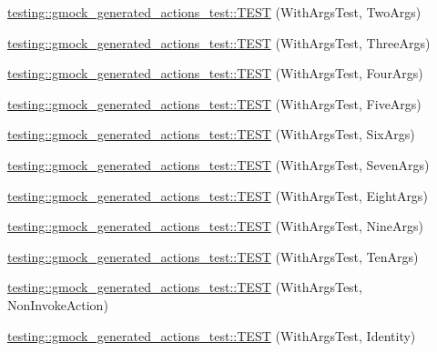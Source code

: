 \begin{DoxyCompactItemize}
\hyperlink{namespacetesting_1_1gmock__generated__actions__test_afadf90d2d0acc55906bfd7f0f43f8a04}{testing\+::gmock\+\_\+generated\+\_\+actions\+\_\+test\+::\+T\+E\+ST} (With\+Args\+Test, Two\+Args)
\item 
\hyperlink{namespacetesting_1_1gmock__generated__actions__test_acae0920fc83b3990663b9d448b8bfd9a}{testing\+::gmock\+\_\+generated\+\_\+actions\+\_\+test\+::\+T\+E\+ST} (With\+Args\+Test, Three\+Args)
\item 
\hyperlink{namespacetesting_1_1gmock__generated__actions__test_ab7046e566f75756b6fe1ec4d92ff7c2b}{testing\+::gmock\+\_\+generated\+\_\+actions\+\_\+test\+::\+T\+E\+ST} (With\+Args\+Test, Four\+Args)
\item 
\hyperlink{namespacetesting_1_1gmock__generated__actions__test_ab51a43ea1c760e001330400d6cec5bfc}{testing\+::gmock\+\_\+generated\+\_\+actions\+\_\+test\+::\+T\+E\+ST} (With\+Args\+Test, Five\+Args)
\item 
\hyperlink{namespacetesting_1_1gmock__generated__actions__test_a167731ec11d5cf4135d95b01dc59e223}{testing\+::gmock\+\_\+generated\+\_\+actions\+\_\+test\+::\+T\+E\+ST} (With\+Args\+Test, Six\+Args)
\item 
\hyperlink{namespacetesting_1_1gmock__generated__actions__test_a04970f4db4de11d91e59ae8769dccea1}{testing\+::gmock\+\_\+generated\+\_\+actions\+\_\+test\+::\+T\+E\+ST} (With\+Args\+Test, Seven\+Args)
\item 
\hyperlink{namespacetesting_1_1gmock__generated__actions__test_a5cbb36915cb29391752600a2a0e9c7e1}{testing\+::gmock\+\_\+generated\+\_\+actions\+\_\+test\+::\+T\+E\+ST} (With\+Args\+Test, Eight\+Args)
\item 
\hyperlink{namespacetesting_1_1gmock__generated__actions__test_aee9acec4535339649dd3067f671cc6c1}{testing\+::gmock\+\_\+generated\+\_\+actions\+\_\+test\+::\+T\+E\+ST} (With\+Args\+Test, Nine\+Args)
\item 
\hyperlink{namespacetesting_1_1gmock__generated__actions__test_a6a818f5a6c2250d3944f90e4331ebc0e}{testing\+::gmock\+\_\+generated\+\_\+actions\+\_\+test\+::\+T\+E\+ST} (With\+Args\+Test, Ten\+Args)
\item 
\hyperlink{namespacetesting_1_1gmock__generated__actions__test_a5380c41df40cb159d58d4c4c81aeac19}{testing\+::gmock\+\_\+generated\+\_\+actions\+\_\+test\+::\+T\+E\+ST} (With\+Args\+Test, Non\+Invoke\+Action)
\item 
\hyperlink{namespacetesting_1_1gmock__generated__actions__test_a0499d0970300d8d6c252a898222b8dd3}{testing\+::gmock\+\_\+generated\+\_\+actions\+\_\+test\+::\+T\+E\+ST} (With\+Args\+Test, Identity)

\end{DoxyCompactItemize}
